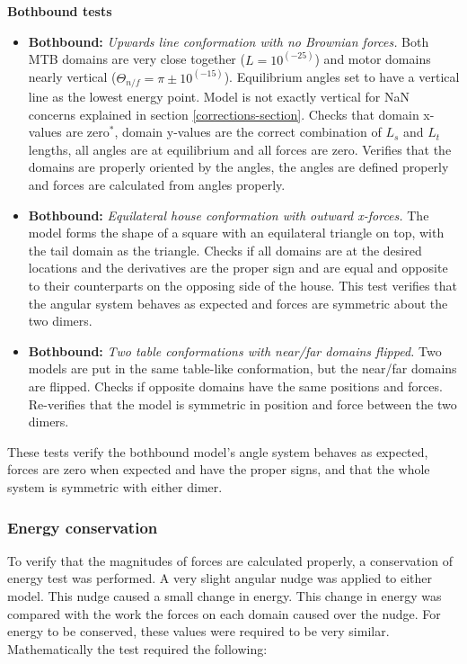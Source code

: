 \documentclass[10pt]{article} %
\begin{document}
\textbf{Bothbound tests}
\begin{itemize}
\item \textbf{Bothbound:} \textit{Upwards line conformation with no Brownian forces.} Both MTB domains are very close together ($L=10^(-25)$) and motor domains nearly vertical ($\Theta_{n/f} = \pi \pm 10^(-15)$). Equilibrium angles set to have a vertical line as the lowest energy point. Model is not exactly vertical for NaN concerns explained in section \ref{corrections-section}. Checks that domain x-values are zero$^*$, domain y-values are the correct combination of $L_s$ and $L_t$ lengths, all angles are at equilibrium and all forces are zero. Verifies that the domains are properly oriented by the angles, the angles are defined properly and forces are calculated from angles properly.
\item \textbf{Bothbound:} \textit{Equilateral house conformation with outward x-forces.} The model forms the shape of a square with an equilateral triangle on top, with the tail domain as the triangle. Checks if all domains are at the desired locations and the derivatives are the proper sign and are equal and opposite to their counterparts on the opposing side of the house. This test verifies that the angular system behaves as expected and forces are symmetric about the two dimers.
\item \textbf{Bothbound:} \textit{Two table conformations with near/far domains flipped.} Two models are put in the same table-like conformation, but the near/far domains are flipped. Checks if opposite domains have the same positions and forces. Re-verifies that the model is symmetric in position and force between the two dimers.
\end{itemize}

These tests verify the bothbound model's angle system behaves as expected, forces are zero when expected and have the proper signs, and that the whole system is symmetric with either dimer.

\subsubsection{Energy conservation}
To verify that the magnitudes of forces are calculated properly, a conservation of energy test was performed. A very slight angular nudge was applied to either model. This nudge caused a small change in energy. This change in energy was compared with the work the forces on each domain caused over the nudge. For energy to be conserved, these values were required to be very similar. Mathematically the test required the following:
\end{document}
